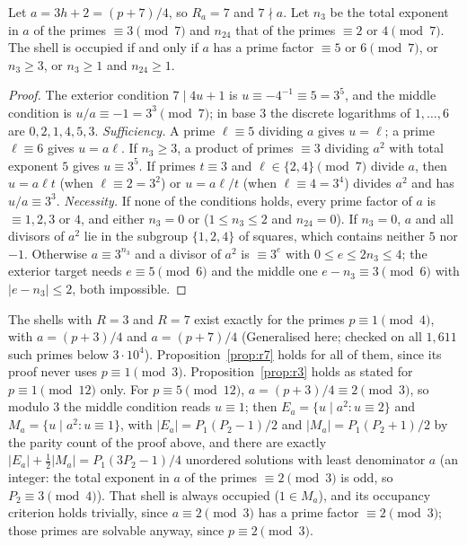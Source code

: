 \begin{proposition}\label{prop:r7}
Let $a=3h+2=(p+7)/4$, so $R_a=7$ and $7\nmid a$. Let $n_3$ be the total exponent in $a$ of the primes $\equiv3\pmod7$ and $n_{24}$ that of the primes $\equiv2$ or $4\pmod 7$. The shell is occupied if and only if $a$ has a prime factor $\equiv5$ or $6\pmod7$, or $n_3\ge3$, or $n_3\ge1$ and $n_{24}\ge1$.
\end{proposition}

\begin{proof}
The exterior condition $7\mid4u+1$ is $u\equiv-4^{-1}\equiv5=3^5$, and the middle condition is $u/a\equiv-1=3^3\pmod7$; in base $3$ the discrete logarithms of $1,\dots,6$ are $0,2,1,4,5,3$.
\emph{Sufficiency.} A prime $\ell\equiv5$ dividing $a$ gives $u=\ell$; a prime $\ell\equiv6$ gives $u=a\ell$. If $n_3\ge3$, a product of primes $\equiv3$ dividing $a^2$ with total exponent $5$ gives $u\equiv3^5$. If primes $t\equiv3$ and $\ell\in\{2,4\}\pmod 7$ divide $a$, then $u=a\ell t$ (when $\ell\equiv2=3^2$) or $u=a\ell/t$ (when $\ell\equiv4=3^4$) divides $a^2$ and has $u/a\equiv3^3$.
\emph{Necessity.} If none of the conditions holds, every prime factor of $a$ is $\equiv1,2,3$ or $4$, and either $n_3=0$ or ($1\le n_3\le2$ and $n_{24}=0$). If $n_3=0$, $a$ and all divisors of $a^2$ lie in the subgroup $\{1,2,4\}$ of squares, which contains neither $5$ nor $-1$. Otherwise $a\equiv3^{n_3}$ and a divisor of $a^2$ is $\equiv3^e$ with $0\le e\le2n_3\le4$; the exterior target needs $e\equiv5\pmod6$ and the middle one $e-n_3\equiv3\pmod6$ with $|e-n_3|\le2$, both impossible.
\end{proof}

The shells with $R=3$ and $R=7$ exist exactly for the primes $p\equiv1\pmod4$, with $a=(p+3)/4$ and $a=(p+7)/4$ (\textsf{Generalised here}; checked on all $1{,}611$ such primes below $3\cdot10^4$). Proposition~\ref{prop:r7} holds for all of them, since its proof never uses $p\equiv1\pmod3$. Proposition~\ref{prop:r3} holds as stated for $p\equiv1\pmod{12}$ only. For $p\equiv5\pmod{12}$, $a=(p+3)/4\equiv2\pmod3$, so modulo $3$ the middle condition reads $u\equiv1$; then $E_a=\{u\mid a^2:u\equiv2\}$ and $M_a=\{u\mid a^2:u\equiv1\}$, with $|E_a|=P_1(P_2-1)/2$ and $|M_a|=P_1(P_2+1)/2$ by the parity count of the proof above, and there are exactly $|E_a|+\frac12|M_a|=P_1(3P_2-1)/4$ unordered solutions with least denominator $a$ (an integer: the total exponent in $a$ of the primes $\equiv2\pmod3$ is odd, so $P_2\equiv3\pmod4$). That shell is always occupied ($1\in M_a$), and its occupancy criterion holds trivially, since $a\equiv2\pmod3$ has a prime factor $\equiv2\pmod3$; those primes are solvable anyway, since $p\equiv2\pmod3$.


